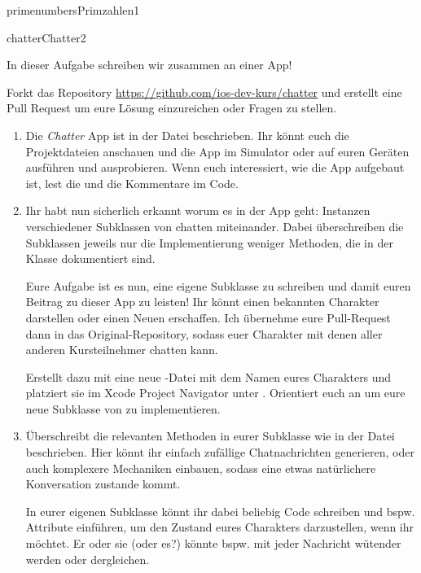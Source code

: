\documentclass[parskip=half, final]{scrreprt}
\begin{document}
\begin{lecture}
\begin{exc}
\begin{excitem*}{primenumbers}{Primzahlen}{1}
\end{excitem*}


\begin{excitem}{chatter}{Chatter}{2}

In dieser Aufgabe schreiben wir zusammen an einer App!

Forkt das Repository \url{https://github.com/ios-dev-kurs/chatter} und erstellt eine Pull Request um eure Lösung einzureichen oder Fragen zu stellen.

\begin{enumerate}[label=\roman*.]

\item Die \emph{Chatter} App ist in der  Datei beschrieben. Ihr könnt euch die Projektdateien anschauen und die App im Simulator oder auf euren Geräten ausführen und ausprobieren. Wenn euch interessiert, wie die App aufgebaut ist, lest die  und die Kommentare im Code.

\item Ihr habt nun sicherlich erkannt worum es in der App geht: Instanzen verschiedener Subklassen von  chatten miteinander. Dabei überschreiben die Subklassen jeweils nur die Implementierung weniger Methoden, die in der  Klasse dokumentiert sind.

Eure Aufgabe ist es nun, eine eigene Subklasse zu schreiben und damit euren Beitrag zu dieser App zu leisten! Ihr könnt einen bekannten Charakter darstellen oder einen Neuen erschaffen. Ich übernehme eure Pull-Request dann in das Original-Repository, sodass euer Charakter mit denen aller anderen Kursteilnehmer chatten kann.

Erstellt dazu mit  eine neue -Datei mit dem Namen eures Charakters und platziert sie im Xcode Project Navigator unter . Orientiert euch an  um eure neue Subklasse von  zu implementieren.

\item Überschreibt die relevanten Methoden in eurer Subklasse wie in der  Datei beschrieben. Hier könnt ihr einfach zufällige Chatnachrichten generieren, oder auch komplexere Mechaniken einbauen, sodass eine etwas natürlichere Konversation zustande kommt.

In eurer eigenen Subklasse könnt ihr dabei beliebig Code schreiben und bspw. Attribute einführen, um den Zustand eures Charakters darzustellen, wenn ihr möchtet. Er oder sie (oder es?) könnte bspw. mit jeder Nachricht wütender werden oder dergleichen.


\end{enumerate}
\end{excitem}
\end{exc}
\end{lecture}
\end{document}
